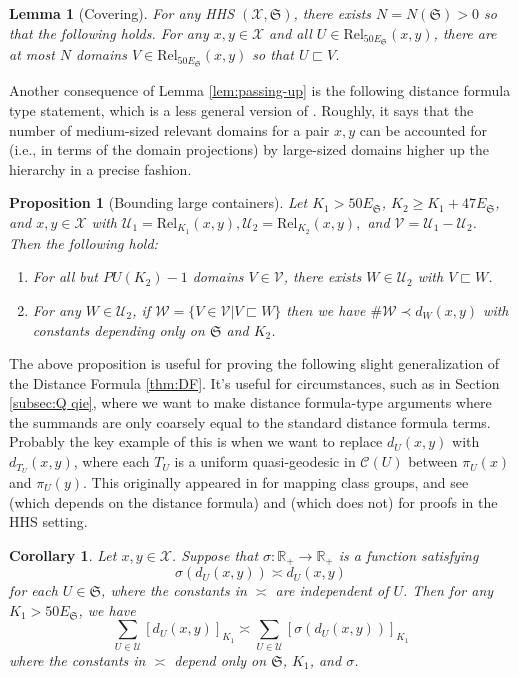 \documentclass{amsart}
\newtheorem{proposition}[theorem]{Proposition}
\newtheorem{corollary}[theorem]{Corollary}
\newtheorem{lemma}[theorem]{Lemma}
\theoremstyle{definition}
\theoremstyle{remark}
\theoremstyle{definition}
\newcommand{\calC}{\mathcal{C}}
\newcommand{\calU}{\mathcal{U}}
\newcommand{\calV}{\mathcal{V}}
\newcommand{\calW}{\mathcal{W}}
\newcommand{\calX}{\mathcal{X}}
\newcommand{\ES}{E_{\mathfrak S}}
\newcommand{\Rel}{\mathrm{Rel}}
\newcommand{\nest}{\sqsubset}
\begin{document}
\begin{lemma}[Covering]\label{lem:covering}
For any HHS $(\calX, \mathfrak S)$, there exists $N = N(\mathfrak S)>0$ so that the following holds.  For any $x,y \in \calX$ and all $U \in \Rel_{50\ES}(x,y)$, there are at most $N$ domains $V \in \Rel_{50\ES}(x,y)$ so that $U \nest V$.
\end{lemma}

Another consequence of Lemma \ref{lem:passing-up} is the following distance formula type statement, which is a less general version of \cite[Proposition 4.14]{Dur_infcube}.  Roughly, it says that the number of medium-sized relevant domains for a pair $x,y$ can be accounted for (i.e., in terms of the domain projections) by large-sized domains higher up the hierarchy in a precise fashion.  

\begin{proposition}[Bounding large containers] \label{prop:bounding containers}
Let $K_1 >50\ES$, $K_2 \geq K_1+47\ES$, and $x,y \in \calX$ with $\calU_1 = \Rel_{K_1}(x,y), \calU_2 = \Rel_{K_2}(x,y),$ and $\calV = \calU_1 - \calU_2$.  Then the following hold:
\begin{enumerate}
    \item For all but $PU(K_2)-1$ domains $V \in \calV$, there exists $W \in \calU_2$ with $V \nest W$.
    \item For any $W \in \calU_2$, if $\calW = \{V \in \calV| V \nest W\}$ then we have $\#\calW \prec d_W(x,y)$ with constants depending only on $\mathfrak S$ and $K_2$.
\end{enumerate}
\end{proposition}

The above proposition is useful for proving the following slight generalization of the Distance Formula \ref{thm:DF}.  It's useful for circumstances, such as in Section \ref{subsec:Q qie}, where we want to make distance formula-type arguments where the summands are only coarsely equal to the standard distance formula terms.  Probably the key example of this is when we want to replace $d_U(x,y)$ with $d_{T_U}(x,y)$, where each $T_U$ is a uniform quasi-geodesic in $\calC(U)$ between $\pi_U(x)$ and $\pi_U(y)$.  This originally appeared in \cite[Lemma 9.6]{Min_ELC} for mapping class groups, and see \cite[Theorem 2.9]{BHMS:kill_twists} (which depends on the distance formula) and \cite[Corollary 4.17]{Dur_infcube} (which does not) for proofs in the HHS setting.

\begin{corollary}\label{cor:DF replace}
Let $x,y \in \calX$.  Suppose that $\sigma:\mathbb R_+ \to \mathbb R_+$ is a function satisfying 
$$\sigma(d_U(x,y)) \asymp d_U(x,y)$$
for each $U \in \mathfrak S$, where the constants in $\asymp$ are independent of $U$.  Then for any $K_1>50\ES$, we have
$$\sum_{U \in \calU} [d_U(x,y)]_{K_1} \asymp \sum_{U \in \calU} [\sigma(d_U(x,y))]_{K_1}$$
where the constants in $\asymp$ depend only on $\mathfrak S$, $K_1$, and $\sigma$.
\end{corollary}
\end{document}

